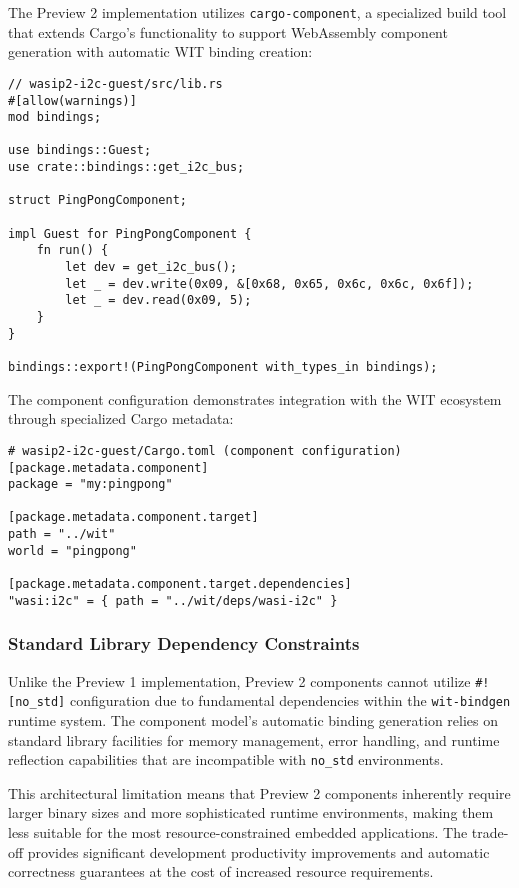 The Preview 2 implementation utilizes \texttt{cargo-component}, a specialized build tool that extends Cargo's functionality to support WebAssembly component generation with automatic WIT binding creation:

\begin{verbatim}
// wasip2-i2c-guest/src/lib.rs
#[allow(warnings)]
mod bindings;

use bindings::Guest;
use crate::bindings::get_i2c_bus;

struct PingPongComponent;

impl Guest for PingPongComponent {
    fn run() {
        let dev = get_i2c_bus();
        let _ = dev.write(0x09, &[0x68, 0x65, 0x6c, 0x6c, 0x6f]);
        let _ = dev.read(0x09, 5);
    }
}

bindings::export!(PingPongComponent with_types_in bindings);
\end{verbatim}

The component configuration demonstrates integration with the WIT ecosystem through specialized Cargo metadata:

\begin{verbatim}
# wasip2-i2c-guest/Cargo.toml (component configuration)
[package.metadata.component]
package = "my:pingpong"

[package.metadata.component.target]
path = "../wit"
world = "pingpong"

[package.metadata.component.target.dependencies]
"wasi:i2c" = { path = "../wit/deps/wasi-i2c" }
\end{verbatim}

\subsubsection{Standard Library Dependency Constraints}

Unlike the Preview 1 implementation, Preview 2 components cannot utilize \texttt{\#![no\_std]} configuration due to fundamental dependencies within the \texttt{wit-bindgen} runtime system. The component model's automatic binding generation relies on standard library facilities for memory management, error handling, and runtime reflection capabilities that are incompatible with \texttt{no\_std} environments.

This architectural limitation means that Preview 2 components inherently require larger binary sizes and more sophisticated runtime environments, making them less suitable for the most resource-constrained embedded applications. The trade-off provides significant development productivity improvements and automatic correctness guarantees at the cost of increased resource requirements.

